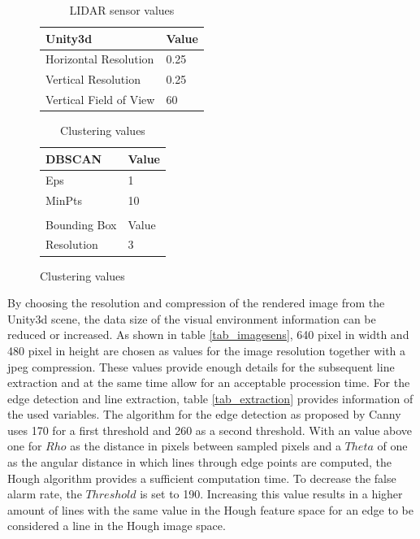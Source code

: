  \begin{figure}[!htb]
 	\begin{minipage}[t]{0.48\textwidth}	
 		 \begin{table}[H]	
 			\centering
 			\caption{\ac{LIDAR} sensor values}
 				\begin{tabular}{l l } 
 				\midrule\midrule
 				Unity3d  & Value\\ 
 				\midrule
 				Horizontal Resolution	& 0.25\\
 				Vertical Resolution& 0.25 \\
 				Vertical Field of View	& 60\degree
 				\end{tabular}
 			\label{tab_lidarsens}
 		\end{table}
 	\end{minipage}\hfill
 	\begin{minipage}[t]{0.48\textwidth}
 		 \begin{table}[H]
 			\centering
 			\caption{Clustering values}
 				\begin{tabular}{l l } 
	 			\midrule\midrule 
 				DBSCAN  & Value\\ 
 				\midrule
 				Eps&1 \\	
 			    MinPts&10 \\\\
 			    
 				\midrule\midrule
 				Bounding Box & Value\\
 				\midrule
 				Resolution & 3
 				\end{tabular}
 			\label{tab_cluster}
 		\end{table}
 	\end{minipage}
 \end{figure}
 By choosing the resolution and compression of the rendered image from the Unity3d scene, the data size of the visual environment information can be reduced or increased. As shown in table \ref{tab_imagesens}, 640 pixel in width and 480 pixel in height are chosen as values for the image resolution together with a jpeg compression. These values provide enough details for the subsequent line extraction and at the same time allow for an acceptable procession time. For the edge detection and line extraction, table \ref{tab_extraction} provides information of the used variables. The algorithm for the edge detection as proposed by Canny uses 170 for a first threshold and 260 as a second threshold. With an value above one for $Rho$ as the distance in pixels between sampled pixels and a $Theta$ of one as the angular distance in which lines through edge points are computed, the Hough algorithm provides a sufficient computation time. To decrease the false alarm rate, the $Threshold$ is set to 190. Increasing this value results in a higher amount of lines with the same value in the Hough feature space for an edge to be considered a line in the Hough image space.
